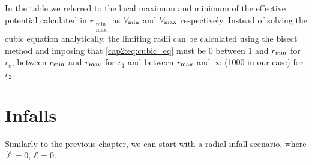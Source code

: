 In the table we referred to the local maximum and minimum of the effective
potential calculated in $r_{\substack{\text{min} \\ \text{max}}}$ as
$V_{\rm min}$ and $V_{\rm max}$ respectively.
Instead of solving the cubic equation analytically, the limiting radii can be
calculated using the bisect method and imposing that \ref{cap2:eq:cubic_eq}
must be 0 between 1 and $r_{\rm min}$ for $r_e$, between $r_{\rm min}$ and
$r_{\rm max}$ for $r_1$ and between $r_{\rm max}$ and $\infty$ (1000 in our
case) for $r_2$.


\newpage


\section{Infalls}

Similarly to the previous chapter, we can start with a radial infall scenario,
where $\hat \ell = 0$, $\mathcal E = 0$.

